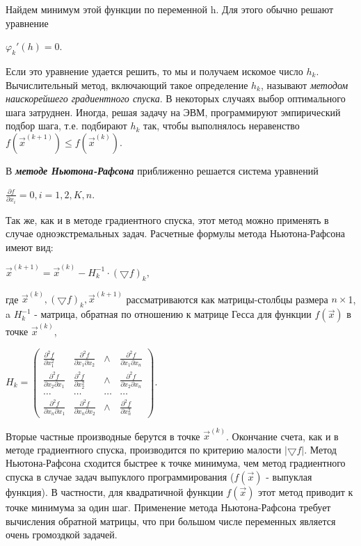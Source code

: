 {Найдем минимум этой функции по переменной h. Для этого обычно решают уравнение
\begin{center}
	${\varphi_{k}}'(h)=0.$
\end{center}

Если это уравнение удается решить, то мы и получаем искомое число $h_{k}$. Вычислительный метод,  включающий такое определение $h_{k}$, называют \textit{методом наискорейшего градиентного спуска}. В некоторых случаях выбор оптимального шага затруднен. Иногда, решая задачу на ЭВМ, программируют эмпирический подбор шага, т.е. подбирают $h_{k}$ так, чтобы выполнялось неравенство $f(\vec{x}^{(k+1)})\leq f(\vec{x}^{(k)})$.

В \textbf{\textit{методе Ньютона-Рафсона }} приближенно решается система уравнений
\begin{center}
	$\frac{\partial f}{\partial x_{i}} = 0, i=1, 2, K, n.$
\end{center}
Так же, как и в методе градиентного спуска, этот метод можно применять в случае одноэкстремальных задач. Расчетные формулы метода Ньютона-Рафсона имеют вид:

\begin{center}
	$\vec{x}^{(k+1)}=\vec{x}^{(k)}-H_{k}^{-1}\cdot (\bigtriangledown f)_{k},$
\end{center}
где $\vec{x}^{(k)}, (\bigtriangledown f)_{k},\vec{x}^{(k+1)}$ рассматриваются как матрицы-столбцы размера $n \times$1, a $H_{k}^{-1}$ - матрица, обратная по отношению к матрице Гесса для функции $f(\vec{x})$ в точке $\vec{x}^{(k)}$,
\begin{center}
	$H_{k}=\begin{pmatrix}
	\frac{\partial^{2}f}{\partial x_{1}^{2}}& \frac{\partial^{2}f}{\partial x_{1} \partial x_{2}} & \wedge  & \frac{\partial^{2}f}{\partial x_{1} \partial x_{n}}\\
	\frac{\partial^{2}f}{\partial x_{2} \partial x_{1}}& \frac{\partial^{2}f}{\partial x_{2}^{2}} & \wedge  & \frac{\partial^{2}f}{\partial x_{2} \partial x_{n}}\\
	\dots & \dots & \dots & \dots \\
	\frac{\partial^{2}f}{\partial x_{n} \partial x_{1}}& \frac{\partial^{2}f}{\partial x_{n} \partial x_{2}} & \wedge  & \frac{\partial^{2}f}{\partial x_{n}^{2} }
	\end{pmatrix}.$
\end{center}

Вторые частные производные берутся в точке $\vec{x}^{(k)}$. Окончание счета, как и в методе градиентного спуска, производится по критерию малости  $\left |\bigtriangledown f  \right |$. Метод Ньютона-Рафсона сходится быстрее к точке минимума, чем метод градиентного спуска в случае задач  выпуклого  программирования ($f(\vec{x})$ - выпуклая функция). В частности, для квадратичной функции  $f(\vec{x})$ этот метод приводит к точке минимума за один шаг. Применение метода Ньютона-Рафсона требует  вычисления обратной  матрицы, что при большом числе переменных является очень громоздкой задачей.

}
